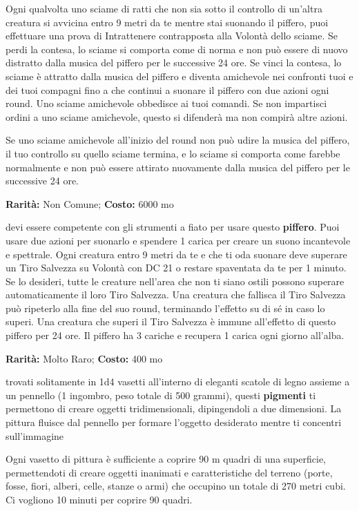 \begin{multicols}{2}
Ogni qualvolta uno sciame di ratti che non sia sotto il controllo di un'altra creatura si avvicina entro 9 metri da te mentre stai suonando il piffero, puoi effettuare una prova di Intrattenere contrapposta alla Volontà dello sciame. Se perdi la contesa, lo sciame si comporta come di norma e non può essere di nuovo distratto dalla musica del piffero per le successive 24 ore. Se vinci la contesa, lo sciame è attratto dalla musica del piffero e diventa amichevole nei confronti tuoi e dei tuoi compagni fino a che continui a suonare il piffero con due azioni ogni round. Uno sciame amichevole obbedisce ai tuoi comandi. Se non impartisci ordini a uno sciame amichevole, questo si difenderà ma non compirà altre azioni.

Se uno sciame amichevole all'inizio del round non può udire la musica del piffero, il tuo controllo su quello sciame termina, e lo sciame si comporta come farebbe normalmente e non può essere attirato nuovamente dalla musica del piffero per le successive 24 ore.


\textbf{Rarità:} Non Comune; \textbf{Costo:} 6000 mo

devi essere competente con gli strumenti a fiato per usare questo \textbf{piffero}. Puoi usare due azioni per suonarlo e spendere 1 carica per creare un suono incantevole e spettrale. Ogni creatura entro 9 metri da te e che ti oda suonare deve superare un Tiro Salvezza su Volontà con DC 21 o restare spaventata da te per 1 minuto. Se lo desideri, tutte le creature nell'area che non ti siano ostili possono superare automaticamente il loro Tiro Salvezza. Una creatura che fallisca il Tiro Salvezza può ripeterlo alla fine del suo round, terminando l'effetto su di sé in caso lo superi. Una creatura che superi il Tiro Salvezza è immune all'effetto di questo piffero per 24 ore. Il piffero ha 3 cariche e recupera 1 carica ogni giorno all'alba.


\textbf{Rarità:} Molto Raro; \textbf{Costo:} 400 mo

trovati solitamente in 1d4 vasetti all'interno di eleganti scatole di legno assieme a un pennello (1 ingombro, peso totale di 500 grammi), questi \textbf{pigmenti} ti permettono di creare oggetti tridimensionali, dipingendoli a due dimensioni. La pittura fluisce dal pennello per formare l'oggetto desiderato mentre ti concentri sull'immagine

Ogni vasetto di pittura è sufficiente a coprire 90 m quadri di una superficie, permettendoti di creare oggetti inanimati e caratteristiche del terreno (porte, fosse, fiori, alberi, celle, stanze o armi) che occupino un totale di 270 metri cubi. Ci vogliono 10 minuti per coprire 90 quadri.


\end{multicols}
